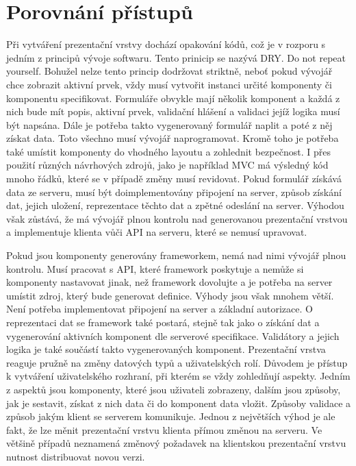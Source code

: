 \section{Porovnání přístupů}
Při vytváření prezentační vrstvy dochází opakování kódů, což je v rozporu s jedním z principů vývoje softwaru. Tento prinicip se nazývá DRY. Do not repeat yourself. Bohužel nelze tento princip dodržovat striktně, neboť pokud vývojář chce zobrazit aktivní prvek, vždy musí vytvořit instanci určité komponenty či komponentu specifikovat. Formuláře obvykle mají několik komponent a každá z nich bude mít popis, aktivní prvek, validační hlášení a validaci jejíž logika musí být napsána. Dále je potřeba takto vygenerovaný formulář naplit a poté z něj získat data. Toto všechno musí vývojář naprogramovat. Kromě toho je potřeba také umístit komponenty do vhodného layoutu a zohlednit bezpečnost. I přes použití různých návrhových zdrojů, jako je například MVC \cite{fowler} má výsledný kód mnoho řádků, které se v případě změny musí revidovat. Pokud formulář získává data ze serveru, musí být doimplementovány připojení na server, způsob získání dat, jejich uložení, reprezentace těchto dat a zpětné odeslání na server. Výhodou však zůstává, že má vývojář plnou kontrolu nad generovanou prezentační vrstvou a implementuje klienta vůči API na serveru, které se nemusí upravovat.

Pokud jsou komponenty generovány frameworkem, nemá nad nimi vývojář plnou kontrolu. Musí pracovat s API, které framework poskytuje a nemůže si komponenty nastavovat jinak, než framework dovolujte a je potřeba na server umístit zdroj, který bude generovat definice. Výhody jsou však mnohem větší. Není potřeba implementovat připojení na server a základní autorizace. O reprezentaci dat se framework také postará, stejně tak jako o získání dat a vygenerování aktivních komponent dle serverové specifikace. Validátory a jejich logika je také součástí takto vygenerovaných komponent. Prezentační vrstva reaguje pružně na změny datových typů a uživatelských rolí. Důvodem je přístup k vytváření uživatelského rozhraní, při kterém se vždy zohledňují aspekty. Jedním z aspektů jsou komponenty, které jsou uživateli zobrazeny, dalším jsou způsoby, jak je sestavit, získat z nich data či do komponent data vložit. Způsoby validace a způsob jakým klient se serverem komunikuje. Jednou z největších výhod je ale fakt, že lze měnit prezentační vrstvu klienta přímou změnou na serveru. Ve většině případů neznamená změnový požadavek na klientskou prezentační vrstvu nutnost distribuovat novou verzi.

